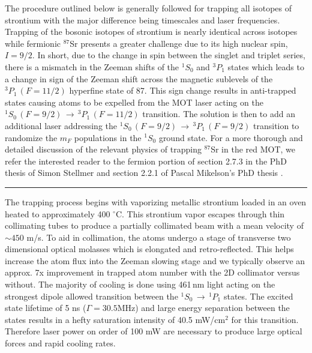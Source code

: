 The procedure outlined below is generally followed for trapping all isotopes of strontium with the major difference being timescales and laser frequencies.
Trapping of the bosonic isotopes of strontium is nearly identical across isotopes while fermionic $^{87}$Sr presents a greater challenge due to its high nuclear spin, $I=9/2$.
In short, due to the change in spin between the singlet and triplet series, there is a mismatch in the Zeeman shifts of the $^1S_0$ and $^3P_1$ states which leads to a change in sign of the Zeeman shift across the magnetic sublevels of the $^3P_1\,(F=11/2)$ hyperfine state of 87.
This sign change results in anti-trapped states causing atoms to be expelled from the MOT laser acting on the $^1S_0\,(F=9/2)\,\rightarrow\,^3P_1\,(F=11/2)$ transition.
The solution is then to add an additional laser addressing the $^1S_0\,(F=9/2)\,\rightarrow\,^3P_1\,(F=9/2)$ transition to randomize the $m_F$ populations in the $^1S_0$ ground state.
For a more thorough and detailed discussion of the relevant physics of trapping $^{87}$Sr in the red MOT, we refer the interested reader to the fermion portion of section 2.7.3 in the PhD thesis of Simon Stellmer \cite{SimonStellmer2013} and section 2.2.1 of Pascal Mikelson's PhD thesis \cite{Mickelson2010b}.

\noindent \rule{75pt}{0.5pt} \newline
The trapping process begins with vaporizing metallic strontium loaded in an oven heated to approximately 400 $^{\circ}$C. 
This strontium vapor escapes through thin collimating tubes to produce a partially collimated beam with a mean velocity of $\sim450$ m/s.
To aid in collimation, the atoms undergo a stage of transverse two dimensional optical molasses which is elongated and retro-reflected.
This helps increase the atom flux into the Zeeman slowing stage and we typically observe an approx. 7x improvement in trapped atom number with the 2D collimator versus without.
The majority of cooling is done using 461\,nm light acting on the strongest dipole allowed transition between the $^1S_0\,\rightarrow\,^1P_1$ states.
The excited state lifetime of 5 ns ($\Gamma=30.5$MHz) and large energy separation between the states results in a hefty saturation intensity of 40.5 mW/cm$^2$ for this transition.
Therefore laser power on order of 100 mW are necessary to produce large optical forces and rapid cooling rates.


